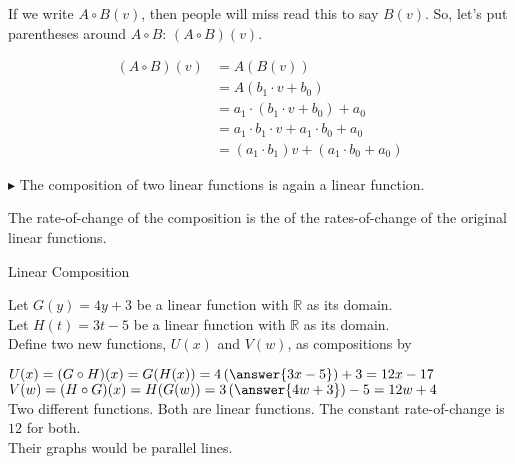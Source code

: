 \documentclass{ximera}
\begin{document}
If we write $A \circ B(v)$, then people will miss read this to say $B(v)$.  So, let's put parentheses around $A \circ B$: $(A \circ B)(v)$.







\begin{align*}
(A \circ B)(v) & = A(B(v)) \\
& = A(b_1 \cdot v + b_0)  \\
& = a_1 \cdot (b_1 \cdot v + b_0) + a_0  \\
& = a_1 \cdot b_1 \cdot v + a_1 \cdot b_0 + a_0    \\
& = (a_1 \cdot b_1) v + (a_1 \cdot b_0 + a_0)
\end{align*}






$\blacktriangleright$ The composition of two linear functions is again a linear function.

The rate-of-change of the composition is the  of the rates-of-change of the original linear functions.





\begin{example} Linear Composition

Let $G(y) = 4 y + 3$ be a linear function with $\mathbb{R}$ as its domain. \\
Let $H(t) = 3 t -5$ be a linear function with $\mathbb{R}$ as its domain. \\


Define two new functions, $U(x)$ and $V(w)$, as compositions by

$U(x) = (G \circ H)(x) = G(H(x)) = 4 \left(\answer{3 x - 5}\right) + 3 = 12 x -17$ \\
$V(w) = (H \circ G)(x) =H(G(w)) = 3 \left(\answer{4 w + 3}\right) - 5 = 12 w + 4$ \\


Two different functions. Both are linear functions. The constant rate-of-change is $12$ for both. \\

Their graphs would be parallel lines. \\


\end{example}
\end{document}
